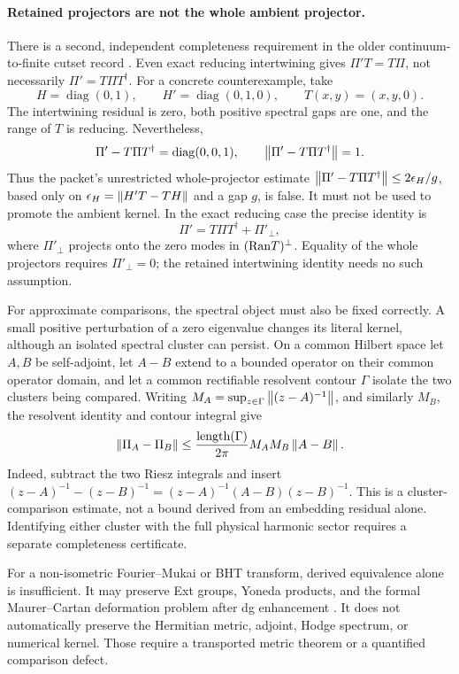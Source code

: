 \documentclass[11pt,a4paper]{article}
\begin{document}
\paragraph{Retained projectors are not the whole ambient projector.}
There is a second, independent completeness requirement in the older
continuum-to-finite cutset record \cite{Q79IntertwinerCutset2026}.
Even exact reducing intertwining gives
\(\Pi'T=T\Pi\), not necessarily \(\Pi'=T\Pi T^\dagger\).
For a concrete counterexample, take
\[
H=\operatorname{diag}(0,1),\qquad
H'=\operatorname{diag}(0,1,0),\qquad T(x,y)=(x,y,0).
\]
The intertwining residual is zero, both positive spectral gaps are one,
and the range of \(T\) is reducing. Nevertheless,
\[
\Pi'-T\Pi T^\dagger=\operatorname{diag}(0,0,1),\qquad
\left\lVert \Pi'-T\Pi T^\dagger \right\rVert=1.
\]
Thus the packet's unrestricted whole-projector estimate
\(\left\lVert \Pi'-T\Pi T^\dagger \right\rVert\leq2\epsilon_H/g\), based only on
\(\epsilon_H=\left\lVert H'T-TH \right\rVert\) and a gap \(g\), is false.
It must not be used to promote the ambient kernel. In the exact reducing
case the precise identity is
\[
\Pi'=T\Pi T^\dagger+\Pi'_\perp,
\]
where \(\Pi'_\perp\) projects onto the zero modes in
\((\mathrm{Ran} T)^\perp\). Equality of the whole projectors requires
\(\Pi'_\perp=0\); the retained intertwining identity needs no such assumption.

For approximate comparisons, the spectral object must also be fixed
correctly. A small positive perturbation of a zero eigenvalue changes its
literal kernel, although an isolated spectral cluster can persist. On a
common Hilbert space let \(A,B\) be self-adjoint, let \(A-B\) extend to a
bounded operator on their common operator domain, and let a common rectifiable
resolvent contour \(\Gamma\) isolate the two clusters being compared.
Writing \(M_A=\sup_{z\in\Gamma}\left\lVert (z-A)^{-1} \right\rVert\), and similarly
\(M_B\), the resolvent identity and contour integral give
\[
\left\lVert \Pi_A-\Pi_B \right\rVert
 \leq \frac{\operatorname{length}(\Gamma)}{2\pi}
 M_A M_B\left\lVert A-B \right\rVert.
\]
Indeed, subtract the two Riesz integrals and insert
\((z-A)^{-1}-(z-B)^{-1}=(z-A)^{-1}(A-B)(z-B)^{-1}\).
This is a cluster-comparison estimate, not a bound derived from an
embedding residual alone. Identifying either cluster with the full
physical harmonic sector requires a separate completeness certificate.

For a non-isometric Fourier--Mukai or BHT transform, derived equivalence alone
is insufficient.  It may preserve Ext groups, Yoneda products, and the formal
Maurer--Cartan deformation problem after dg enhancement
\cite{LuntsOrlov2009,Wei2015,BrinzanescuHalanayTrautmann2010}.  It does not
automatically preserve the Hermitian metric, adjoint, Hodge spectrum, or
numerical kernel.  Those require a transported metric theorem or a quantified
comparison defect.
\end{document}
